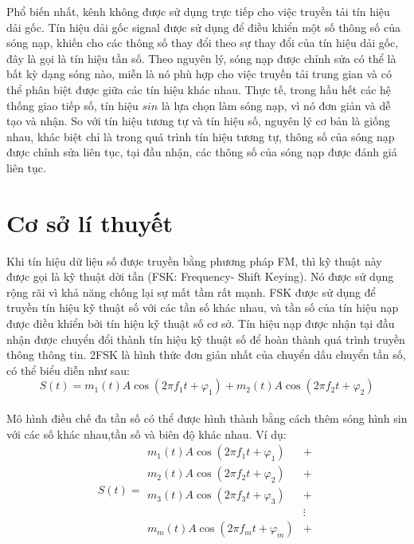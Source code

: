 \newpage

	Phổ biến nhất, kênh không được sử dụng trực tiếp cho việc truyền tải tín hiệu dải gốc. Tín hiệu dải gốc signal được sử dụng để điều khiển một số thông số của sóng nạp, khiến cho các thông số thay đổi theo sự thay đổi của tín hiệu dải gốc, đây là gọi là tín hiệu tần số. Theo nguyên lý, sóng nạp được chỉnh sửa có thể là bất kỳ dạng sóng nào, miễn là nó phù hợp cho việc truyền tải trung gian và có thể phân biệt được giữa các tín hiệu khác nhau. Thực tế, trong hầu hết các hệ thống giao tiếp số, tín hiệu $sin$ là lựa chọn làm sóng nạp, vì nó đơn giản và dễ tạo và nhận. So với tín hiệu tương tự và tín hiệu số, nguyên lý cơ bản là giống nhau, khác biệt chỉ là trong quá trình tín hiệu tương tự, thông số của sóng nạp được chỉnh sửa liên tục, tại đầu nhận, các thông số của sóng nạp được đánh giá liên tục.


\section{Cơ sở lí thuyết}

    Khi tín hiệu dữ liệu số được truyền bằng phương pháp FM, thì kỹ thuật này được gọi là kỹ thuật dời tần (FSK: Frequency- Shift Keying). Nó được sử dụng rộng rãi vì khả năng chống lại sự mất tầm rất mạnh. FSK được sử dụng để truyền tín hiệu kỹ thuật số với các tần số khác nhau, và tần số của tín hiệu nạp được điều khiển bởi tín hiệu kỹ thuật số cơ sở. Tín hiệu nạp được nhận tại đầu nhận được chuyển đổi thành tín hiệu kỹ thuật số để hoàn thành quá trình truyền thông thông tin. 2FSK là hình thức đơn giản nhất của chuyển dấu chuyển tần số, có thể biểu diễn như sau: \\
	\[S(t) = m_1(t)A\cos(2 \pi f_1 t + \varphi _1) + m_2(t)A\cos(2 \pi f_2 t + \varphi _2) \] \\
	
Mô hình điều chế đa tần số có thể được hình thành bằng cách thêm sóng hình sin với các số khác nhau,tần số và biên độ khác nhau. Ví dụ: \\
	\[ S(t) = 
\begin{array}{cc}
m_1(t)A\cos(2 \pi f_1 t + \varphi _1) & + \\
m_2(t)A\cos(2 \pi f_2 t + \varphi _2) & + \\
m_3(t)A\cos(2 \pi f_3 t + \varphi _3) & + \\
 & \vdots \\
m_m(t)A\cos(2 \pi f_m t + \varphi _m) & +
\end{array}
 \] \\
